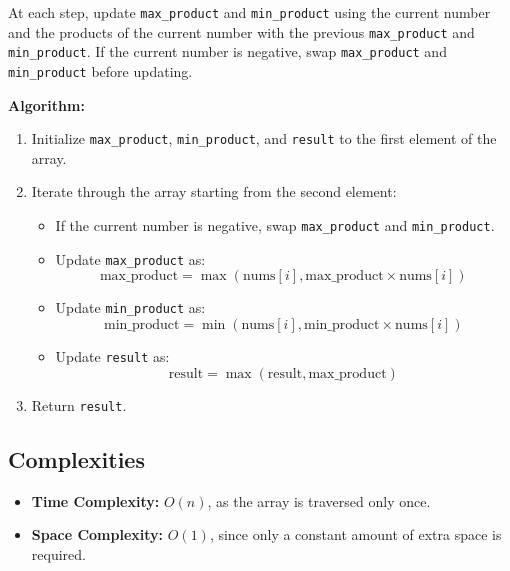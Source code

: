 At each step, update \texttt{max\_product} and \texttt{min\_product} using the current number and the products of the current number with the previous \texttt{max\_product} and \texttt{min\_product}. If the current number is negative, swap \texttt{max\_product} and \texttt{min\_product} before updating.

\textbf{Algorithm:}
\begin{enumerate}
    \item Initialize \texttt{max\_product}, \texttt{min\_product}, and \texttt{result} to the first element of the array.
    \item Iterate through the array starting from the second element:
    \begin{itemize}
        \item If the current number is negative, swap \texttt{max\_product} and \texttt{min\_product}.
        \item Update \texttt{max\_product} as:
        \[
        \text{max\_product} = \max(\text{nums}[i], \text{max\_product} \times \text{nums}[i])
        \]
        \item Update \texttt{min\_product} as:
        \[
        \text{min\_product} = \min(\text{nums}[i], \text{min\_product} \times \text{nums}[i])
        \]
        \item Update \texttt{result} as:
        \[
        \text{result} = \max(\text{result}, \text{max\_product})
        \]
    \end{itemize}
    \item Return \texttt{result}.
\end{enumerate}

\subsection*{Complexities}
\begin{itemize}
    \item \textbf{Time Complexity:} \(O(n)\), as the array is traversed only once.
    \item \textbf{Space Complexity:} \(O(1)\), since only a constant amount of extra space is required.
\end{itemize}

